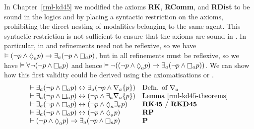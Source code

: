 In Chapter~\ref{rml-kd45} we modified the axioms {\bf RK}, {\bf RComm}, and {\bf RDist} to be sound in the logics \logicRmlKFF{} and \logicRmlKD{} by placing a syntactic restriction on the axioms, prohibiting the direct nesting of modalities belonging to the same agent.
This syntactic restriction is not sufficient to ensure that the axioms are sound in \logicRmlS{}.
In particular, in \logicRmlKFF{} and \logicRmlKD{} refinements need not be reflexive, so we have $\entails (\lnot \atomP \land \possibleA \atomP) \implies \somerefsA (\lnot \atomP \land \necessaryA \atomP)$, but in \logicRmlS{} all refinements must be reflexive, so we have $\entails \allrefs \lnot (\lnot \atomP \land \necessaryA \atomP)$ and hence $\entails \lnot ((\lnot \atomP \land \possibleA \atomP) \implies \somerefsA (\lnot \atomP \land \necessaryA \atomP))$.
We can show how this first validity could be derived using the axiomatisations \axiomRmlKFF{} or \axiomRmlKD{}.
$$
\begin{array}{ll}
    \proves \somerefsA (\lnot \atomP \land \necessaryA \atomP) \iff \somerefsA (\lnot \atomP \land \coversA \{\atomP\}) & \text{Defn. of $\coversA$}\\
    \proves \somerefsA (\lnot \atomP \land \necessaryA \atomP) \iff (\lnot \atomP \land \somerefsA \coversA \{\atomP\}) & \text{Lemma~\ref{rml-kd45-theorems}}\\
    \proves \somerefsA (\lnot \atomP \land \necessaryA \atomP) \iff (\lnot \atomP \land \possibleA \somerefsA \atomP) & \text{{\bf RK45} / {\bf RKD45}}\\
    \proves \somerefsA (\lnot \atomP \land \necessaryA \atomP) \iff (\lnot \atomP \land \possibleA \atomP) & {\bf RP}\\
    \proves (\lnot \atomP \land \possibleA \atomP) \implies \somerefsA (\lnot \atomP \land \necessaryA \atomP) & {\bf P}
\end{array}
$$


